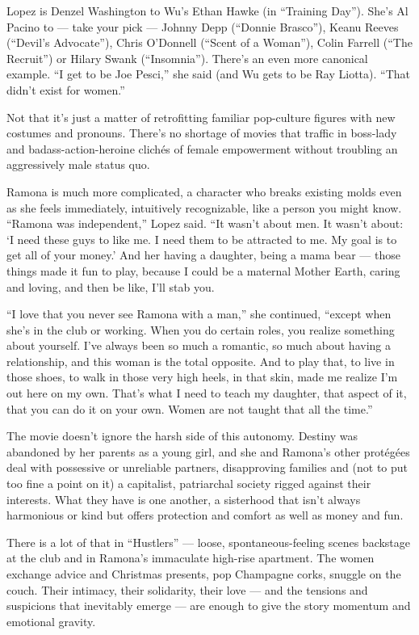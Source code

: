 Lopez is Denzel Washington to Wu's Ethan Hawke (in ``Training Day'').
She's Al Pacino to --- take your pick --- Johnny Depp (``Donnie
Brasco''), Keanu Reeves (``Devil's Advocate''), Chris O'Donnell (``Scent
of a Woman''), Colin Farrell (``The Recruit'') or Hilary Swank
(``Insomnia''). There's an even more canonical example. ``I get to be
Joe Pesci,'' she said (and Wu gets to be Ray Liotta). ``That didn't
exist for women.''

Not that it's just a matter of retrofitting familiar pop-culture figures
with new costumes and pronouns. There's no shortage of movies that
traffic in boss-lady and badass-action-heroine clichés of female
empowerment without troubling an aggressively male status quo.

Ramona is much more complicated, a character who breaks existing molds
even as she feels immediately, intuitively recognizable, like a person
you might know. ``Ramona was independent,'' Lopez said. ``It wasn't
about men. It wasn't about: `I need these guys to like me. I need them
to be attracted to me. My goal is to get all of your money.' And her
having a daughter, being a mama bear --- those things made it fun to
play, because I could be a maternal Mother Earth, caring and loving, and
then be like, I'll stab you.

``I love that you never see Ramona with a man,'' she continued, ``except
when she's in the club or working. When you do certain roles, you
realize something about yourself. I've always been so much a romantic,
so much about having a relationship, and this woman is the total
opposite. And to play that, to live in those shoes, to walk in those
very high heels, in that skin, made me realize I'm out here on my own.
That's what I need to teach my daughter, that aspect of it, that you can
do it on your own. Women are not taught that all the time.''

The movie doesn't ignore the harsh side of this autonomy. Destiny was
abandoned by her parents as a young girl, and she and Ramona's other
protégées deal with possessive or unreliable partners, disapproving
families and (not to put too fine a point on it) a capitalist,
patriarchal society rigged against their interests. What they have is
one another, a sisterhood that isn't always harmonious or kind but
offers protection and comfort as well as money and fun.

There is a lot of that in ``Hustlers'' --- loose, spontaneous-feeling
scenes backstage at the club and in Ramona's immaculate high-rise
apartment. The women exchange advice and Christmas presents, pop
Champagne corks, snuggle on the couch. Their intimacy, their solidarity,
their love --- and the tensions and suspicions that inevitably emerge
--- are enough to give the story momentum and emotional gravity.

